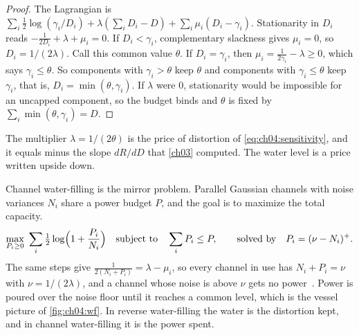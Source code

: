 \begin{proof}
The Lagrangian is $\sum_i\frac12\log(\gamma_i/D_i)+\lambda(\sum_iD_i-D)+\sum_i\mu_i(D_i-\gamma_i)$. Stationarity in $D_i$ reads $-\frac1{2D_i}+\lambda+\mu_i=0$. If $D_i<\gamma_i$, complementary slackness gives $\mu_i=0$, so $D_i=1/(2\lambda)$. Call this common value $\theta$. If $D_i=\gamma_i$, then $\mu_i=\frac1{2\gamma_i}-\lambda\ge0$, which says $\gamma_i\le\theta$. So components with $\gamma_i>\theta$ keep $\theta$ and components with $\gamma_i\le\theta$ keep $\gamma_i$, that is, $D_i=\min(\theta,\gamma_i)$. If $\lambda$ were $0$, stationarity would be impossible for an uncapped component, so the budget binds and $\theta$ is fixed by $\sum_i\min(\theta,\gamma_i)=D$.
\end{proof}

The multiplier $\lambda=1/(2\theta)$ is the price of distortion of \eqref{eq:ch04:sensitivity}, and it equals minus the slope $dR/dD$ that \cref{ch03} computed. The water level is a price written upside down.

Channel water-filling is the mirror problem. Parallel Gaussian channels with noise variances $N_i$ share a power budget $P$, and the goal is to maximize the total capacity.
\begin{equation}\label{eq:ch04:cwf}
\max_{P_i\ge0}\ \sum_i\tfrac12\log\Bigl(1+\frac{P_i}{N_i}\Bigr)\quad\text{subject to}\quad\sum_iP_i\le P,
\qquad\text{solved by}\quad P_i=(\nu-N_i)^+ .
\end{equation}
The same steps give $\frac{1}{2(N_i+P_i)}=\lambda-\mu_i$, so every channel in use has $N_i+P_i=\nu$ with $\nu=1/(2\lambda)$, and a channel whose noise is above $\nu$ gets no power~\cite{coverthomas2006}. Power is poured over the noise floor until it reaches a common level, which is the vessel picture of \cref{fig:ch04:wf}. In reverse water-filling the water is the distortion kept, and in channel water-filling it is the power spent.


